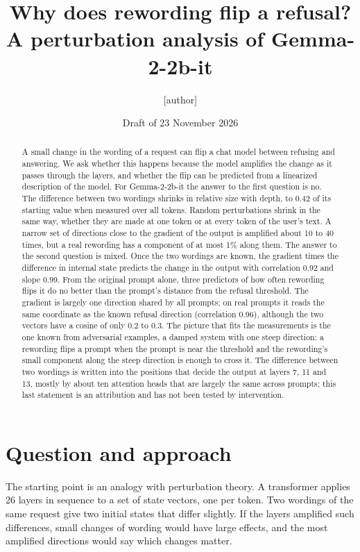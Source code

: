 \documentclass[11pt]{article}
\title{Why does rewording flip a refusal?\\A perturbation analysis of Gemma-2-2b-it}
\author{[author]}
\date{Draft of 23 November 2026}
\begin{document}
\maketitle

\begin{abstract}
A small change in the wording of a request can flip a chat model between refusing and answering. We ask whether this happens because the model amplifies the change as it passes through the layers, and whether the flip can be predicted from a linearized description of the model. For Gemma-2-2b-it the answer to the first question is no. The difference between two wordings shrinks in relative size with depth, to 0.42 of its starting value when measured over all tokens. Random perturbations shrink in the same way, whether they are made at one token or at every token of the user's text. A narrow set of directions close to the gradient of the output is amplified about 10 to 40 times, but a real rewording has a component of at most 1\% along them. The answer to the second question is mixed. Once the two wordings are known, the gradient times the difference in internal state predicts the change in the output with correlation 0.92 and slope 0.99. From the original prompt alone, three predictors of how often rewording flips it do no better than the prompt's distance from the refusal threshold. The gradient is largely one direction shared by all prompts; on real prompts it reads the same coordinate as the known refusal direction (correlation 0.96), although the two vectors have a cosine of only 0.2 to 0.3. The picture that fits the measurements is the one known from adversarial examples, a damped system with one steep direction: a rewording flips a prompt when the prompt is near the threshold and the rewording's small component along the steep direction is enough to cross it. The difference between two wordings is written into the positions that decide the output at layers 7, 11 and 13, mostly by about ten attention heads that are largely the same across prompts; this last statement is an attribution and has not been tested by intervention.
\end{abstract}

\section{Question and approach}
\label{sec:question}

The starting point is an analogy with perturbation theory. A transformer applies 26 layers in sequence to a set of state vectors, one per token. Two wordings of the same request give two initial states that differ slightly. If the layers amplified such differences, small changes of wording would have large effects, and the most amplified directions would say which changes matter.
\end{document}
